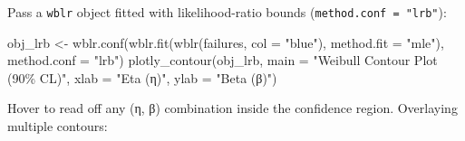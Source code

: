 \documentclass[
  letterpaper,
  DIV=11,
  numbers=noendperiod]{scrreprt}
\newenvironment{Shaded}{\begin{snugshade}}{\end{snugshade}}
\newcommand{\AttributeTok}[1]{\textcolor[rgb]{0.40,0.45,0.13}{#1}}
\newcommand{\FunctionTok}[1]{\textcolor[rgb]{0.28,0.35,0.67}{#1}}
\newcommand{\NormalTok}[1]{\textcolor[rgb]{0.00,0.23,0.31}{#1}}
\newcommand{\OtherTok}[1]{\textcolor[rgb]{0.00,0.23,0.31}{#1}}
\newcommand{\StringTok}[1]{\textcolor[rgb]{0.13,0.47,0.30}{#1}}
\begin{document}
Pass a \texttt{wblr} object fitted with likelihood-ratio bounds
(\texttt{method.conf\ =\ "lrb"}):

\begin{Shaded}
\begin{Highlighting}[]
\NormalTok{obj\_lrb }\OtherTok{\textless{}{-}} \FunctionTok{wblr.conf}\NormalTok{(}\FunctionTok{wblr.fit}\NormalTok{(}\FunctionTok{wblr}\NormalTok{(failures, }\AttributeTok{col =} \StringTok{"blue"}\NormalTok{), }\AttributeTok{method.fit =} \StringTok{"mle"}\NormalTok{),}
                     \AttributeTok{method.conf =} \StringTok{"lrb"}\NormalTok{)}
\FunctionTok{plotly\_contour}\NormalTok{(obj\_lrb,}
               \AttributeTok{main =} \StringTok{"Weibull Contour Plot (90\% CL)"}\NormalTok{,}
               \AttributeTok{xlab =} \StringTok{"Eta (η)"}\NormalTok{, }\AttributeTok{ylab =} \StringTok{"Beta (β)"}\NormalTok{)}
\end{Highlighting}
\end{Shaded}

Hover to read off any (η, β) combination inside the confidence region.
Overlaying multiple contours:
\end{document}
